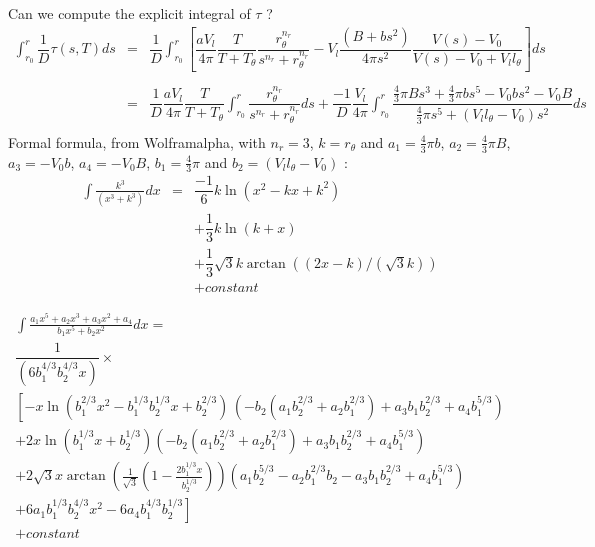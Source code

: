 \documentclass[11pt,a4paper]{article}
\newcommand{\dint}{\displaystyle \int}
\begin{document}
Can we compute the explicit integral of $\tau$ ? 
$$\begin{array}{rcl}
\dint_{r_{0}}^{r} \dfrac{1}{D} \tau(s, T) ds & = &  \dfrac{1}{D} \dint_{r_{0}}^{r} \left[\dfrac{aV_l}{4\pi}  \dfrac{T}{T + T_{\theta}} \dfrac{r_{\theta}^{n_r}}{s^{n_r}+ r_{\theta}^{n_r}} - V_l \dfrac{(B + bs^2)}{4\pi s^2} \dfrac{V(s) - V_0}{V(s) - V_0 + V_l  l_{\theta}}\right] ds \\
 &&\\
& = & \dfrac{1}{D} \dfrac{aV_l}{4\pi}  \dfrac{T}{T + T_{\theta}} \dint_{r_{0}}^{r} \dfrac{r_{\theta}^{n_r}}{s^{n_r}+ r_{\theta}^{n_r}} ds 

+ \dfrac{-1}{D} \dfrac{V_l}{4\pi} \dint_{r_{0}}^{r} \dfrac{\frac{4}{3} \pi B s^3 + \frac{4}{3} \pi b s^5 - V_0 b s^2 - V_0 B}{\frac{4}{3} \pi s^5 + (V_l l_{\theta} - V_0)s^2} ds \\
\end{array}
$$ 
Formal formula, from Wolframalpha, with $n_r = 3$, $k = r_{\theta}$ and $a_1 = \frac{4}{3} \pi b$, $a_2 = \frac{4}{3} \pi B$, $a_3 = - V_0 b$, $a_4 = - V_0 B$, $b_1 = \frac{4}{3} \pi$ and $b_2 = (V_l l_{\theta} - V_0)$ : 
$$\begin{array}{rcl}
\displaystyle \int \frac{k^3}{(x^3 + k^3)} dx & = & \dfrac{-1}{6} k \ln(x^2 - k x + k^2) \\
& & + \dfrac{1}{3} k \ln(k + x) \\
& & + \dfrac{1}{3} \sqrt{3} k \arctan((2 x - k)/(\sqrt{3} k))  \\
&& + constant
\end{array}$$

$$\begin{array}{l}
\displaystyle \int \frac{a_1 x^5 + a_2 x^3 + a_3 x^2 + a_4}{b_1 x^5 + b_2 x^2} dx = \\

\dfrac{1}{(6 b_1^{4/3} b_2^{4/3} x)} \times  \\

\left[-x \ln\left(b_1^{2/3} x^2 - b_1^{1/3} b_2^{1/3} x + b_2^{2/3}\right) \, (-b_2 (a_1 b_2^{2/3} + a_2 b_1^{2/3}) + a_3 b_1 b_2^{2/3} + a_4 b_1^{5/3}) \right. \\

 + 2 x \ln(b_1^{1/3} x + b_2^{1/3}) (-b_2 (a_1 b_2^{2/3} + a_2 b_1^{2/3}) + a_3 b_1 b_2^{2/3} + a_4 b_1^{5/3})  \\

 + 2 \sqrt{3} x \arctan(\frac{1}{\sqrt 3} (1 - \frac{2 b_1^{1/3} x}{b_2^{1/3}} )) (a_1 b_2^{5/3} - a_2 b_1^{2/3} b_2 - a_3 b_1 b_2^{2/3} + a_4 b_1^{5/3}) \\

 +\left. 6 a_1 b_1^{1/3} b_2^{4/3} x^2 - 6 a_4 b_1^{4/3} b_2^{1/3} \right] \\

 + constant \\
\end{array}$$
\end{document}
